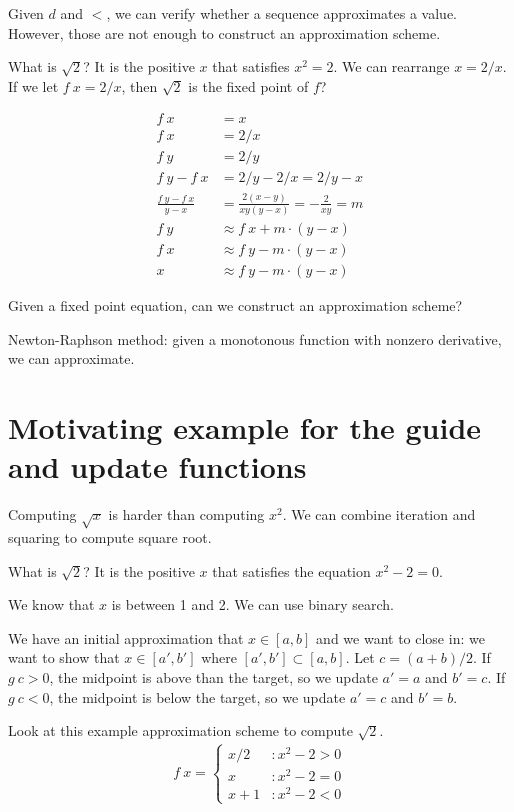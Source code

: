 Given \(d\) and \(<\), we can verify whether a sequence approximates a value.
However, those are not enough to construct an approximation scheme.

What is \(\sqrt{2}\)? It is the positive \(x\) that satisfies \(x^2 = 2\).
We can rearrange \(x = 2/x\). If we let \(f~x = 2/x\), then \(\sqrt{2}\) is the fixed point of \(f\)?

\begin{align*}
    f~x &= x
    \\
    f~x &= 2/x
    \\
    f~y &= 2/y
    \\
    f~y - f~x &= 2/y - 2/x = 2/y - x
    \\
    \frac{f~y - f~x}{y - x} &= \frac{2(x-y)}{xy(y-x)} = - \frac{2}{xy} = m
    \\
    f~y &\approx f~x + m \cdot (y - x)
    \\
    f~x &\approx f~y - m \cdot (y - x)
    \\
    x &\approx f~y - m \cdot (y - x)
\end{align*}

Given a fixed point equation, can we construct an approximation scheme?

Newton-Raphson method: given a monotonous function with nonzero derivative, we can approximate.

\section{Motivating example for the guide and update functions}

Computing \(\sqrt{x}\) is harder than computing \(x^2\).
We can combine iteration and squaring to compute square root.

What is \(\sqrt{2}\)? It is the positive \(x\) that satisfies the equation \(x^2 - 2 = 0\).

We know that \(x\) is between 1 and 2.
We can use binary search.

We have an initial approximation that \(x \in [a,b]\) and we want to close in:
we want to show that \(x \in [a',b']\) where \([a',b'] \subset [a,b]\).
Let \(c = (a+b)/2\). If \(g~c > 0\), the midpoint is above than the target,
so we update \(a' = a\) and \(b' = c\).
If \(g~c < 0\), the midpoint is below the target,
so we update \(a' = c\) and \(b' = b\).

Look at this example approximation scheme to compute \(\sqrt{2}\).
\begin{align*}
    f~x = \begin{cases}
        x / 2 &: x^2 - 2 > 0
        \\
        x &: x^2 - 2 = 0
        \\
        x + 1 &: x^2 - 2 < 0
    \end{cases}
\end{align*}

